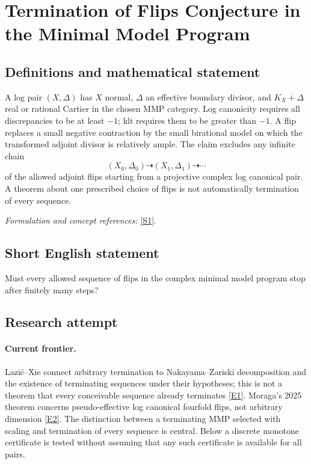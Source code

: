 \documentclass[11pt,a4paper]{article}
\numberwithin{equation}{section}
\newcommand{\sref}[2]{\hyperlink{source:#1:#2}{[S#2]}}
\newcommand{\eref}[2]{\hyperlink{extra:#1:#2}{[E#2]}}
\newif\ifshowcatalogue
\newcommand{\cataloguescope}[1]{\ifshowcatalogue
 \paragraph{Exact scope in the supplied catalogue.}
 \begin{quote}\small #1\end{quote}\fi}
\begin{document}
\setcounter{section}{71}
\section{\texorpdfstring{Termination of Flips Conjecture in the Minimal Model Program}{Termination of Flips Conjecture in the Minimal Model Program}}\label{72}
\subsection{Definitions and mathematical statement}
A log pair $(X,\Delta)$ has $X$ normal, $\Delta$ an effective boundary divisor, and $K_X+\Delta$ real or rational Cartier in the chosen MMP category. Log canonicity requires all discrepancies to be at least $-1$; klt requires them to be greater than $-1$. A flip replaces a small negative contraction by the small birational model on which the transformed adjoint divisor is relatively ample. The claim excludes any infinite chain
\[
 (X_0,\Delta_0)\dashrightarrow(X_1,\Delta_1)\dashrightarrow\cdots
\]
of the allowed adjoint flips starting from a projective complex log canonical pair. A theorem about one prescribed choice of flips is not automatically termination of every sequence.
\par\smallskip\textit{Formulation and concept references:} \sref{72}{1}.
\cataloguescope{Prove that there is no infinite sequence of flips in the minimal model program: for a projective log canonical (or klt) pair over the complex numbers, every sequence of (K\_X + Delta)-flips terminates after finitely many steps, in every dimension.}
\subsection{Short English statement}
Must every allowed sequence of flips in the complex minimal model program stop after finitely many steps?
\subsection{Research attempt}

\paragraph{Current frontier.}
Lazi\'c--Xie connect arbitrary termination to Nakayama--Zariski decomposition
and the existence of terminating sequences under their hypotheses; this
is not a theorem that every conceivable sequence already terminates
\eref{72}{1}. Moraga's 2025 theorem concerns pseudo-effective log canonical
fourfold flips, not arbitrary dimension \eref{72}{2}.
The distinction between a terminating MMP selected with scaling and
termination of every sequence is central. Below a discrete monotone
certificate is tested without assuming that any such certificate is
available for all pairs.
\end{document}

